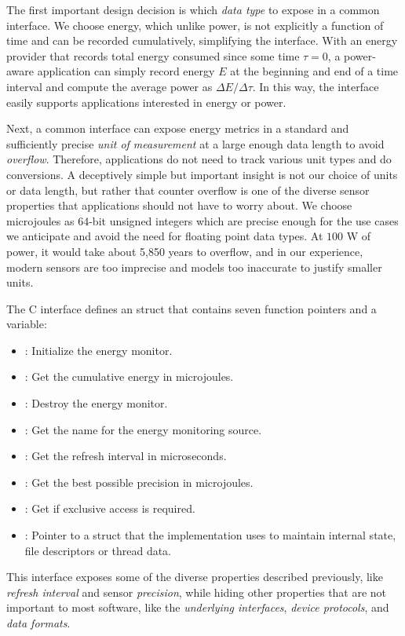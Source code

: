 The first important design decision is which \emph{data type} to expose in a common interface.
We choose energy, which unlike power, is not explicitly a function of time and can be recorded cumulatively, simplifying the interface.
With an energy provider that records total energy consumed since some time $\tau = 0$, a power-aware application can simply record energy $E$ at the beginning and end of a time interval and compute the average power as $\Delta E / \Delta \tau$.
In this way, the interface easily supports applications interested in energy or power.

Next, a common interface can expose energy metrics in a standard and sufficiently precise \emph{unit of measurement} at a large enough data length to avoid \emph{overflow}.
Therefore, applications do not need to track various unit types and do conversions.
A deceptively simple but important insight is not our choice of units or data length, but rather that counter overflow is one of the diverse sensor properties that applications should not have to worry about.
We choose microjoules as 64-bit unsigned integers which are precise enough for the use cases we anticipate and avoid the need for floating point data types.
At $100$ W of power, it would take about 5,850 years to overflow, and in our experience, modern sensors are too imprecise and models too inaccurate to justify smaller units.

The  C interface defines an  struct that contains seven function pointers and a  variable:
\begin{itemize}
\item {}: Initialize the energy monitor.
\item {}: Get the cumulative energy in microjoules.
\item {}: Destroy the energy monitor.
\item {}: Get the name for the energy monitoring source.
\item {}: Get the refresh interval in microseconds.
\item {}: Get the best possible precision in microjoules.
\item {}: Get if exclusive access is required.
\item {}: Pointer to a struct that the implementation uses to maintain internal state, \eg file descriptors or thread data.
\end{itemize}
This interface exposes some of the diverse properties described previously, like \emph{refresh interval} and sensor \emph{precision}, while hiding other properties that are not important to most software, like the \emph{underlying interfaces}, \emph{device protocols}, and \emph{data formats}.

